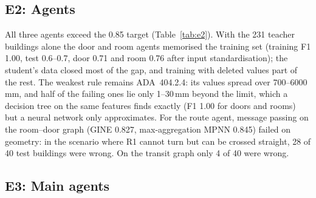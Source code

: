 \documentclass[conference]{IEEEtran}
\newcommand{\ada}[1]{ADA~#1}
\begin{document}
\subsection{E2: Agents}

\begin{table}[t]
\caption{E2: Agent F1 of the failing class on the test split (mean $\pm$ std over 3 seeds)}
\label{tab:e2}
\centering
{}
\end{table}

All three agents exceed the 0.85 target (Table~\ref{tab:e2}). With the 231 teacher buildings alone the door and
room agents memorised the training set (training F1 1.00, test 0.6--0.7, door 0.71 and room 0.76 after input
standardisation); the student's data closed most of the gap, and training with deleted values part of the rest.
The weakest rule remains \ada{404.2.4}: its values spread over 700--6000\,mm, and half of the failing ones lie only
1--30\,mm beyond the limit, which a decision tree on the same features finds exactly (F1 1.00 for doors and rooms)
but a neural network only approximates. For the route agent, message passing on the room--door graph (GINE 0.827,
max-aggregation MPNN 0.845) failed on geometry: in the scenario where R1 cannot turn but can be crossed straight,
28 of 40 test buildings were wrong. On the transit graph only 4 of 40 were wrong.

\subsection{E3: Main agents}
\end{document}
